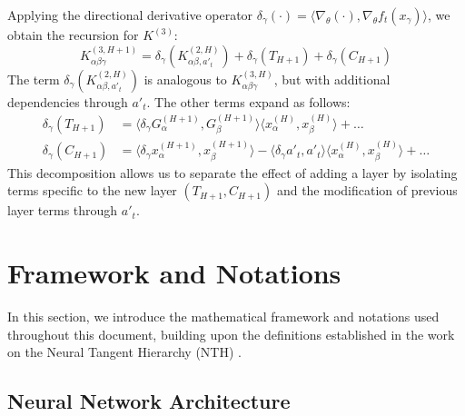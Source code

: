 \documentclass[a4paper]{article}
\begin{document}
Applying the directional derivative operator $\delta_\gamma(\cdot) = \langle \nabla_\theta (\cdot), \nabla_\theta f_t(x_\gamma) \rangle$, we obtain the recursion for $K^{(3)}$:
\begin{equation}
K^{(3, H+1)}_{\alpha\beta\gamma} = \delta_\gamma \left(K^{(2,H)}_{\alpha\beta, a'_t} \right) + \delta_\gamma(T_{H+1}) + \delta_\gamma(C_{H+1})
\end{equation}
The term $\delta_\gamma \left(K^{(2,H)}_{\alpha\beta, a'_t} \right)$ is analogous to $K^{(3,H)}_{\alpha\beta\gamma}$, but with additional dependencies through $a'_t$. The other terms expand as follows:
\begin{align}
\delta_\gamma(T_{H+1}) &= \langle \delta_\gamma G^{(H+1)}_\alpha, G^{(H+1)}_\beta \rangle \langle x^{(H)}_\alpha, x^{(H)}_\beta \rangle + \dots \\
\delta_\gamma(C_{H+1}) &= \langle \delta_\gamma x^{(H+1)}_\alpha, x^{(H+1)}_\beta \rangle - \langle \delta_\gamma a'_t, a'_t \rangle \langle x^{(H)}_\alpha, x^{(H)}_\beta \rangle + \dots
\end{align}
This decomposition allows us to separate the effect of adding a layer by isolating terms specific to the new layer $(T_{H+1}, C_{H+1})$ and the modification of previous layer terms through $a'_t$.






\section{Framework and Notations}

In this section, we introduce the mathematical framework and notations used throughout this document, building upon the definitions established in the work on the Neural Tangent Hierarchy (NTH) \cite{dyer2019asymptoticswidenetworksfeynman}.

\subsection{Neural Network Architecture}
\end{document}
